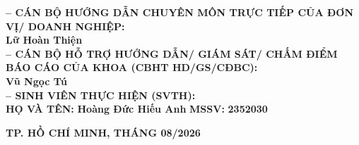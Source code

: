 \begin{titlepage}
\begin{center}
\begin{minipage}{0.82\textwidth}
\textbf{-- CÁN BỘ HƯỚNG DẪN CHUYÊN MÔN TRỰC TIẾP CỦA ĐƠN VỊ/ DOANH NGHIỆP:}\\[0.08cm]
\hspace*{0.45cm}\textbf{Lữ Hoàn Thiện}\\[0.2cm]

\textbf{-- CÁN BỘ HỖ TRỢ HƯỚNG DẪN/ GIÁM SÁT/ CHẤM ĐIỂM BÁO CÁO CỦA KHOA (CBHT HD/GS/CĐBC):}\\[0.08cm]
\hspace*{0.45cm}\textbf{Vũ Ngọc Tú}\\[0.2cm]

\textbf{-- SINH VIÊN THỰC HIỆN (SVTH):}\\[0.08cm]
\textbf{HỌ VÀ TÊN:} \textbf{Hoàng Đức Hiếu Anh}\hfill
\textbf{MSSV:} \textbf{2352030}
\end{minipage}
\end{center}

\vfill
\begin{center}
{\fontsize{15}{18}\selectfont\bfseries
TP. HỒ CHÍ MINH, THÁNG 08/2026}
\end{center}
\end{titlepage}
